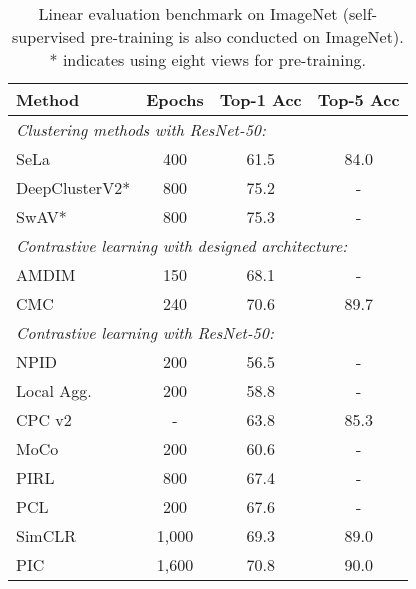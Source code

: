 \documentclass[final]{cvpr}
\begin{document}
\begin{table}[t]
\caption{Linear evaluation benchmark on ImageNet (self-supervised pre-training is also conducted on ImageNet). * indicates using eight views for pre-training.
}
\label{tab:imagenet_results_complete}
\begin{center}
\begin{small}
\begin{tabular}{lccc}
\toprule
Method & Epochs & Top-1 Acc & Top-5 Acc \\
\midrule 
\multicolumn{4}{l}{\textit{Clustering methods with ResNet-50:}}\\
SeLa \cite{Asano2020}  & \hspace{1.5ex}400  & 61.5 & 84.0\\
DeepClusterV2* \cite{caron2020unsupervised} & \hspace{1.5ex}800  & 75.2 & - \\
SwAV* \cite{caron2020unsupervised} & \hspace{1.5ex}800  & 75.3 & - \\
\midrule 
\multicolumn{4}{l}{\textit{Contrastive learning with designed architecture:}}\\
AMDIM \cite{bachman2019learning} & \hspace{1.5ex}150 & 68.1 & - \\
CMC \cite{tian2019contrastive} & \hspace{1.5ex}240  & 70.6  & 89.7\\
\multicolumn{4}{l}{\textit{Contrastive learning with ResNet-50:}}\\
NPID \cite{wu2018unsupervised} & \hspace{1.5ex}200  & 56.5  & -    \\
Local Agg. \cite{zhuang2019local} & \hspace{1.5ex}200  & 58.8  & -    \\
CPC v2~\cite{henaff2019data}      & -    & 63.8  & 85.3  \\
MoCo \cite{he2020momentum} & \hspace{1.5ex}200 & 60.6 & - \\
PIRL \cite{misra2019self}         & \hspace{1.5ex}800 & 67.4 & - \\
PCL \cite{li2020prototypical}         & \hspace{1.5ex}200 & 67.6 & - \\
SimCLR \cite{chen2020simple} & 1,000 & 69.3 & 89.0 \\
PIC \cite{cao2020parametric} & 1,600 & 70.8 & 90.0 \\

\end{tabular}
\end{small}
\end{center}
\end{table}
\end{document}

